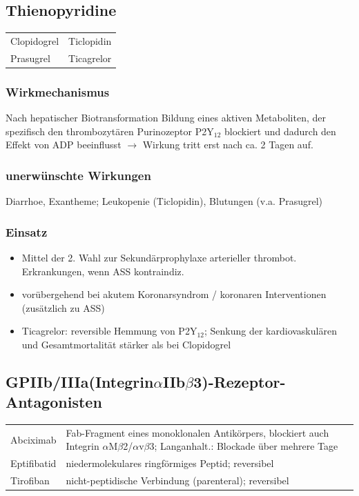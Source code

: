 \documentclass[10pt,a4paper]{report}
\begin{document}
\subsection{Thienopyridine} %
\label{ssub:thienopyridine}
\begin{tabularx}{\textwidth}{XX}
Clopidogrel&Ticlopidin\\
Prasugrel&Ticagrelor\\
\end{tabularx}
\subsubsection{Wirkmechanismus} %
\label{par:wirkmechan}
Nach hepatischer Biotransformation Bildung eines aktiven Metaboliten, der spezifisch den thrombozytären Purinozeptor P2Y$_12$ blockiert und dadurch den Effekt von ADP beeinflusst $\rightarrow$ Wirkung tritt erst nach ca. 2 Tagen auf.
\subsubsection{unerwünschte Wirkungen} %
\label{par:unerw_nschte_wirkungen}
Diarrhoe, Exantheme;  Leukopenie (Ticlopidin), Blutungen (v.a. Prasugrel)
\subsubsection{Einsatz} %
\label{par:einsatz}
\begin{itemize}
	\item Mittel der 2. Wahl zur Sekundärprophylaxe arterieller thrombot. Erkrankungen, wenn ASS kontraindiz.
	\item vorübergehend bei akutem Koronarsyndrom / koronaren Interventionen (zusätzlich zu ASS)
	\item Ticagrelor: reversible Hemmung von P2Y$_12$; Senkung der kardiovaskulären und Gesamtmortalität stärker als bei Clopidogrel
\end{itemize}
\subsection{GPIIb/IIIa(Integrin$\alpha$IIb$\beta$3)-Rezeptor-Antagonisten} %
\label{ssub:gpiib_iiia_integrin_iib_3_rezeptor_antagonisten}
\begin{tabularx}{\textwidth}{XX}
Abciximab&Fab-Fragment eines monoklonalen Antikörpers, 	blockiert auch 	Integrin $\alpha$M$\beta$2/$\alpha$v$\beta$3; Langanhalt.: Blockade über mehrere Tage\\
Eptifibatid&niedermolekulares ringförmiges Peptid; reversibel\\
Tirofiban&nicht-peptidische Verbindung (parenteral); reversibel\\
\end{tabularx}
\end{document}
